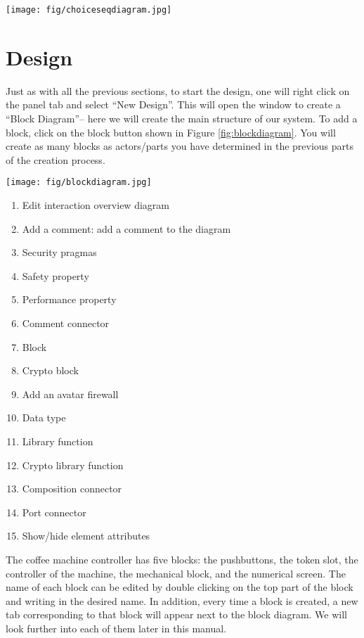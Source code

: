 \documentclass[12pt]{article}
\begin{document}
\begin{figure*}[htbp]
\centering
\texttt{[image: fig/choiceseqdiagram.jpg]}
\caption{Logical progression of the `ChoiceAndService' sequence diagram} \label{fig:choiceseqdiagram}
\end{figure*}

\section{Design}
	Just as with all the previous sections, to start the design, one will right click on the panel tab and select “New Design”. This will open the window to create a “Block Diagram”-- here we will create the main structure of our system. To add a block, click on the block button shown in Figure \ref{fig:blockdiagram}. You will create as many blocks as actors/parts you have determined in the previous parts of the creation process. 


\begin{figure*}[htbp]
\centering
\texttt{[image: fig/blockdiagram.jpg]}
\caption{Structural elements of the block diagram} \label{fig:blockdiagram}
\end{figure*}


\begin{enumerate}
\item Edit interaction overview diagram
\item Add a comment: add a comment to the diagram
\item Security pragmas
\item Safety property
\item Performance property
\item Comment connector
\item Block
\item Crypto block
\item Add an avatar firewall
\item Data type 
\item Library function
\item Crypto library function
\item Composition connector
\item Port connector
\item Show/hide element attributes

\end{enumerate}

The coffee machine controller has five blocks: the pushbuttons, the token slot, the controller of the machine, the mechanical block, and the numerical screen. The name of each block can be edited by double clicking on the top part of the block and writing in the desired name. In addition, every time a block is created, a new tab corresponding to that block will appear next to the block diagram. We will look further into each of them later in this manual.
\end{document}
